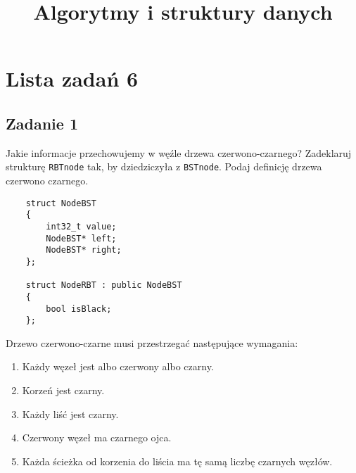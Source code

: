 \documentclass{article}
\begin{document}
\title{Algorytmy i struktury danych}
\author{}
\date{}
\maketitle

\section*{Lista zadań 6}

\subsection*{Zadanie 1}
Jakie informacje przechowujemy w węźle drzewa czerwono-czarnego?
Zadeklaruj strukturę \verb+RBTnode+ tak, by dziedziczyła z \verb+BSTnode+. Podaj definicję drzewa czerwono czarnego.
\begin{lstlisting}
    struct NodeBST
    {
        int32_t value;
        NodeBST* left;
        NodeBST* right;  
    };

    struct NodeRBT : public NodeBST
    {
        bool isBlack;
    };
\end{lstlisting}
Drzewo czerwono-czarne musi przestrzegać następujące wymagania:
\begin{enumerate}
    \item Każdy węzeł jest albo czerwony albo czarny.
    \item Korzeń jest czarny.
    \item Każdy liść jest czarny.
    \item Czerwony węzeł ma czarnego ojca.
    \item Każda ścieżka od korzenia do liścia ma tę samą liczbę czarnych węzłów.
\end{enumerate}
\end{document}
